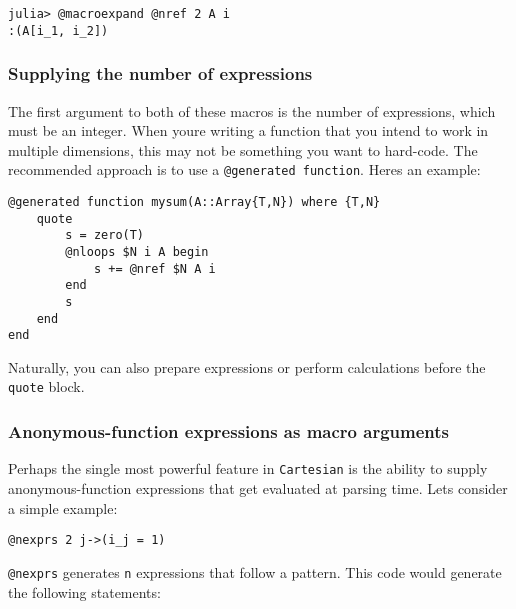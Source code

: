 \begin{verbatim}
julia> @macroexpand @nref 2 A i
:(A[i_1, i_2])
\end{verbatim}





\hypertarget{13048573846185312344}{}


\subsubsection{Supplying the number of expressions}



The first argument to both of these macros is the number of expressions, which must be an integer. When you{\textquotesingle}re writing a function that you intend to work in multiple dimensions, this may not be something you want to hard-code. The recommended approach is to use a \texttt{@generated function}.  Here{\textquotesingle}s an example:




\begin{verbatim}
@generated function mysum(A::Array{T,N}) where {T,N}
    quote
        s = zero(T)
        @nloops $N i A begin
            s += @nref $N A i
        end
        s
    end
end
\end{verbatim}



Naturally, you can also prepare expressions or perform calculations before the \texttt{quote} block.



\hypertarget{10509900364879728464}{}


\subsubsection{Anonymous-function expressions as macro arguments}



Perhaps the single most powerful feature in \texttt{Cartesian} is the ability to supply anonymous-function expressions that get evaluated at parsing time.  Let{\textquotesingle}s consider a simple example:




\begin{verbatim}
@nexprs 2 j->(i_j = 1)
\end{verbatim}



\texttt{@nexprs} generates \texttt{n} expressions that follow a pattern. This code would generate the following statements:




